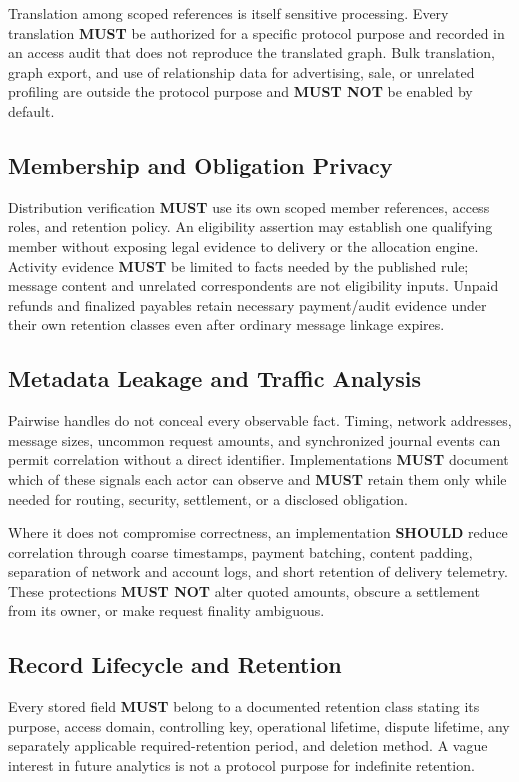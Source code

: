 \documentclass[11pt]{article}
\newcommand{\MUST}{\textbf{MUST}}
\newcommand{\MUSTNOT}{\textbf{MUST NOT}}
\newcommand{\SHOULD}{\textbf{SHOULD}}
\begin{document}
Translation among scoped references is itself sensitive processing. Every
translation \MUST{} be authorized for a specific protocol purpose and recorded in
an access audit that does not reproduce the translated graph. Bulk translation,
graph export, and use of relationship data for advertising, sale, or unrelated
profiling are outside the protocol purpose and \MUSTNOT{} be enabled by default.

\subsection{Membership and Obligation Privacy}

Distribution verification \MUST{} use its own scoped member references, access
roles, and retention policy. An eligibility assertion may establish one qualifying
member without exposing legal evidence to delivery or the allocation engine.
Activity evidence \MUST{} be limited to facts needed by the published rule;
message content and unrelated correspondents are not eligibility inputs.
Unpaid refunds and finalized payables retain necessary payment/audit evidence
under their own retention classes even after ordinary message linkage expires.

\subsection{Metadata Leakage and Traffic Analysis}

Pairwise handles do not conceal every observable fact. Timing, network addresses,
message sizes, uncommon request amounts, and synchronized journal events can permit
correlation without a direct identifier. Implementations \MUST{} document which
of these signals each actor can observe and \MUST{} retain them only while needed
for routing, security, settlement, or a disclosed obligation.

Where it does not compromise correctness, an implementation \SHOULD{} reduce
correlation through coarse timestamps, payment batching, content
padding, separation of network and account logs, and short retention of delivery
telemetry. These protections \MUSTNOT{} alter quoted amounts, obscure a settlement
from its owner, or make request finality ambiguous.

\subsection{Record Lifecycle and Retention}

Every stored field \MUST{} belong to a documented retention class stating its
purpose, access domain, controlling key, operational lifetime, dispute lifetime,
any separately applicable required-retention period, and deletion method. A vague
interest in future analytics is not a protocol purpose for indefinite retention.
\end{document}
